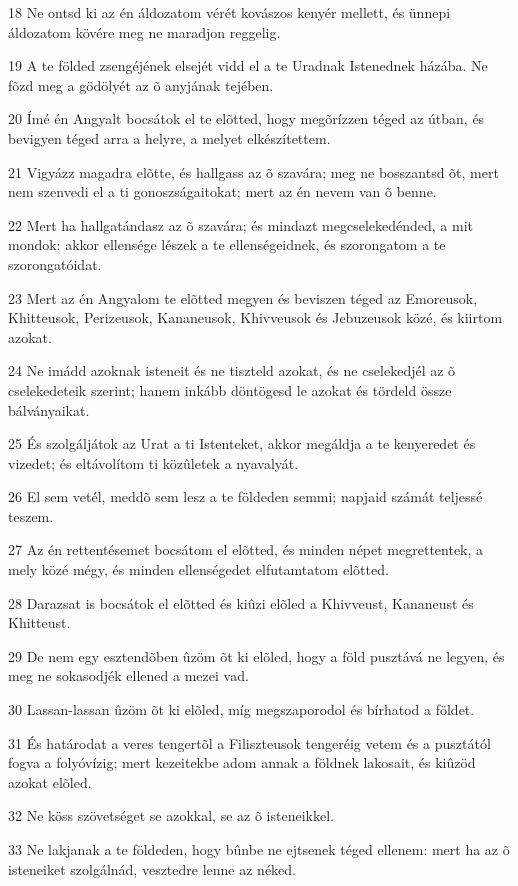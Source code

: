 \par 18 Ne ontsd ki az én áldozatom vérét kovászos kenyér mellett, és ünnepi áldozatom kövére meg ne maradjon reggelig.
\par 19 A te földed zsengéjének elsejét vidd el a te Uradnak Istenednek házába. Ne fõzd meg a gödölyét az õ anyjának tejében.
\par 20 Ímé én Angyalt bocsátok el te elõtted, hogy megõrízzen téged az útban, és bevigyen téged arra a helyre, a melyet elkészítettem.
\par 21 Vigyázz magadra elõtte, és hallgass az õ szavára; meg ne bosszantsd õt, mert nem szenvedi el a ti gonoszságaitokat; mert az én nevem van õ benne.
\par 22 Mert ha hallgatándasz az õ szavára; és mindazt megcselekedénded, a mit mondok: akkor ellensége lészek a te ellenségeidnek, és szorongatom a te szorongatóidat.
\par 23 Mert az én Angyalom te elõtted megyen és beviszen téged az Emoreusok, Khitteusok, Perizeusok, Kananeusok, Khivveusok és Jebuzeusok közé, és kiirtom azokat.
\par 24 Ne imádd azoknak isteneit és ne tiszteld azokat, és ne cselekedjél az õ cselekedeteik szerint; hanem inkább döntögesd le azokat és tördeld össze bálványaikat.
\par 25 És szolgáljátok az Urat a ti Istenteket, akkor megáldja a te kenyeredet és vizedet; és eltávolítom ti közûletek a nyavalyát.
\par 26 El sem vetél, meddõ sem lesz a te földeden semmi; napjaid számát teljessé teszem.
\par 27 Az én rettentésemet bocsátom el elõtted, és minden népet megrettentek, a mely közé mégy, és minden ellenségedet elfutamtatom elõtted.
\par 28 Darazsat is bocsátok el elõtted és kiûzi elõled a Khivveust, Kananeust és Khitteust.
\par 29 De nem egy esztendõben ûzöm õt ki elõled, hogy a föld pusztává ne legyen, és meg ne sokasodjék ellened a mezei vad.
\par 30 Lassan-lassan ûzöm õt ki elõled, míg megszaporodol és bírhatod a földet.
\par 31 És határodat a veres tengertõl a Filiszteusok tengeréig vetem és a pusztától fogva a folyóvízig; mert kezeitekbe adom annak a földnek lakosait, és kiûzöd azokat elõled.
\par 32 Ne köss szövetséget se azokkal, se az õ isteneikkel.
\par 33 Ne lakjanak a te földeden, hogy bûnbe ne ejtsenek téged ellenem: mert ha az õ isteneiket szolgálnád, vesztedre lenne az néked.

